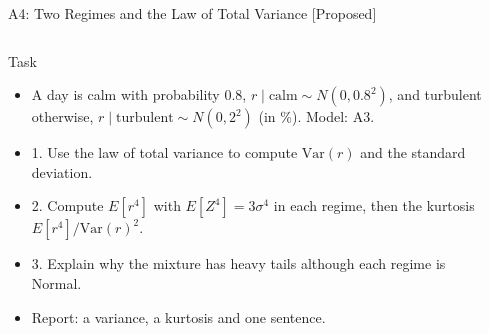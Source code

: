 \begin{frame}{A4: Two Regimes and the Law of Total Variance [Proposed]}
\propsub
\itemsize{\scriptsize}
\begin{columns}[T]
\begin{column}{\taskw}
\begin{block}{Task}
\begin{itemize}
    \item A day is calm with probability $0.8$, $r \mid \text{calm} \sim N(0, 0.8^2)$, and turbulent otherwise, $r \mid \text{turbulent} \sim N(0, 2^2)$ (in \%). Model: A3.
    \item 1. Use the law of total variance to compute $\text{Var}(r)$ and the standard deviation.
    \item 2. Compute $E[r^4]$ with $E[Z^4] = 3\sigma^4$ in each regime, then the kurtosis $E[r^4]/\text{Var}(r)^2$.
    \item 3. Explain why the mixture has heavy tails although each regime is Normal.
    \item Report: a variance, a kurtosis and one sentence.
\end{itemize}
\end{block}
\end{column}
\begin{column}{\solw}
\end{column}
\end{columns}
\end{frame}

